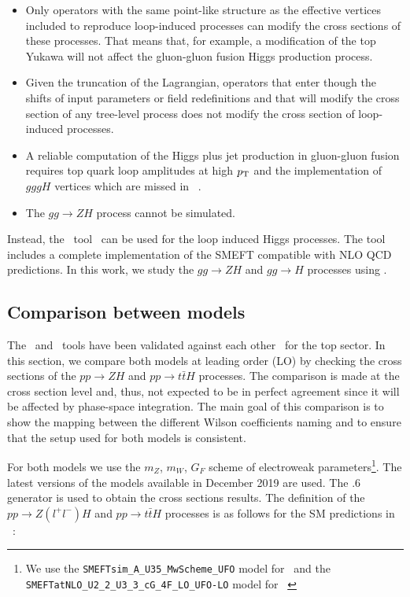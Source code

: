 \begin{itemize}
\item Only operators with the same point-like structure as the effective vertices included to reproduce loop-induced processes can modify the cross sections of these processes. That means that, for example, a modification of the top Yukawa will not affect the gluon-gluon fusion Higgs production process.
\item Given the truncation of the Lagrangian, operators that enter though the shifts of input parameters or field redefinitions and that will modify the cross section of any tree-level process does not modify the cross section of loop-induced processes.
\item A reliable computation of the Higgs plus jet  production in gluon-gluon fusion requires top quark loop amplitudes at high $p_{\textrm T}$ and the implementation of $gggH$ vertices which are missed in \SMEFTsim\ .
\item The $gg\to ZH$ process cannot be simulated.
\end{itemize}

Instead, the \SMEFTatNLO\ tool~\cite{SMEFTNLO} can be used for the loop induced Higgs processes. The tool includes a complete implementation of the SMEFT compatible with NLO QCD predictions. In this work, we study the $gg\to ZH$ and $gg\to H$ processes using \SMEFTatNLO. 


\subsection{Comparison between models}
\label{sec:higgseft:section2}
The \SMEFTsim\ and \SMEFTatNLO\ tools have been validated against each other~\cite{Durieux:2019lnv} for the top sector. In this section, we compare both models at leading order (LO) by checking the cross sections of the $pp\to ZH$ and $pp\to t\bar{t}H$ processes. The comparison is made at the cross section level and, thus, not expected to be in perfect agreement since it will be affected by phase-space integration. The main goal of this comparison is to show the mapping between the different Wilson coefficients naming and to ensure that the setup used for both models is consistent.

For both models we use the $m_Z$, $m_W$, $G_F$ scheme of electroweak parameters\footnote{We use the \texttt{SMEFTsim\_A\_U35\_MwScheme\_UFO} model for \SMEFTsim\ and the \texttt{SMEFTatNLO\_U2\_2\_U3\_3\_cG\_4F\_LO\_UFO-LO} model for \SMEFTatNLO\ }. The latest versions of the models available in December 2019 are used.  The .6 generator is used to obtain the cross sections results. The definition of the $pp\to Z(l^{+}l^{-})H$  and $pp\to t\bar{t}H$  processes is as follows for the SM predictions in \SMEFTsim\ :


